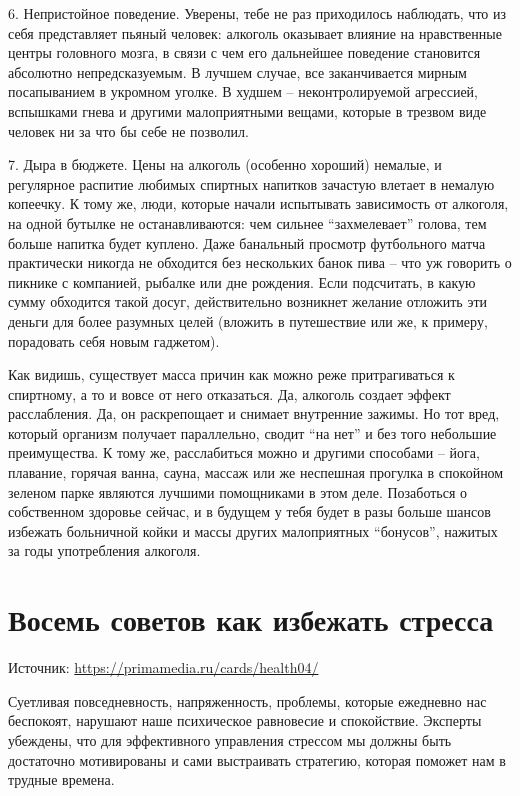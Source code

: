 6. Непристойное поведение. Уверены, тебе не раз приходилось наблюдать, что из себя представляет пьяный человек: алкоголь оказывает влияние на нравственные центры головного мозга, в связи с чем его дальнейшее поведение становится абсолютно непредсказуемым. В лучшем случае, все заканчивается мирным посапыванием в укромном уголке. В худшем – неконтролируемой агрессией, вспышками гнева и другими малоприятными вещами, которые в трезвом виде человек ни за что бы себе не позволил.

7. Дыра в бюджете. Цены на алкоголь (особенно хороший) немалые, и регулярное распитие любимых спиртных напитков зачастую влетает в немалую копеечку. К тому же, люди, которые начали испытывать зависимость от алкоголя, на одной бутылке не останавливаются: чем сильнее “захмелевает” голова, тем больше напитка будет куплено. Даже банальный просмотр футбольного матча практически никогда не обходится без нескольких банок пива – что уж говорить о пикнике с компанией, рыбалке или дне рождения. Если подсчитать, в какую сумму обходится такой досуг, действительно возникнет желание отложить эти деньги для более разумных целей (вложить в путешествие или же, к примеру, порадовать себя новым гаджетом).

Как видишь, существует масса причин как можно реже притрагиваться к спиртному, а то и вовсе от него отказаться. Да, алкоголь создает эффект расслабления. Да, он раскрепощает и снимает внутренние зажимы. Но тот вред, который организм получает параллельно, сводит “на нет” и без того небольшие преимущества. К тому же, расслабиться можно и другими способами – йога, плавание, горячая ванна, сауна, массаж или же неспешная прогулка в спокойном зеленом парке являются лучшими помощниками в этом деле. Позаботься о собственном здоровье сейчас, и в будущем у тебя будет в разы больше шансов избежать больничной койки и массы других малоприятных “бонусов”, нажитых за годы употребления алкоголя.

\newpage
\section{Восемь советов как избежать стресса}
Источник: \url{https://primamedia.ru/cards/health04/}

Суетливая повседневность, напряженность, проблемы, которые ежедневно нас беспокоят, нарушают наше психическое равновесие и спокойствие. Эксперты убеждены, что для эффективного управления стрессом мы должны быть достаточно мотивированы и сами выстраивать стратегию, которая поможет нам в трудные времена.

